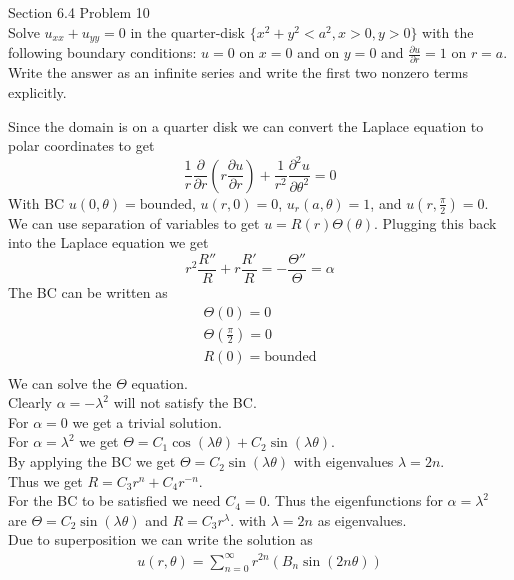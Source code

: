 \documentclass[answers,12pt,addpoints]{exam}
\begin{document}
\begin{questions}
    \question Section 6.4 Problem 10\\
    Solve \( u_{xx} + u_{yy} = 0 \) in the quarter-disk \( \{ x^2 + y^2 < a^2, x > 0, y > 0 \} \) with the following boundary conditions: \( u = 0 \) on \( x = 0 \) and on \( y = 0 \) and \( \frac{\partial u}{\partial r} = 1 \) on \( r = a \). Write the answer as an infinite series and write the first two nonzero terms explicitly.
    \begin{solution}
        Since the domain is on a quarter disk we can convert the Laplace equation to polar coordinates to get
        $$\frac{1}{r} \frac{\partial}{\partial r} \left( r \frac{\partial u}{\partial r} \right) + \frac{1}{r^2} \frac{\partial^2 u}{\partial \theta^2} = 0$$
        With BC $u(0, \theta) = \text{bounded}$, $u(r, 0) = 0$, $u_r(a, \theta) = 1$, and $u(r, \frac{\pi}{2}) = 0$.\\
        We can use separation of variables to get $u = R(r) \Theta(\theta)$. Plugging this back into the Laplace equation we get
        $$ r^2 \frac{R''}{R} + r \frac{R'}{R} = -\frac{\Theta''}{\Theta} = \alpha$$
        The BC can be written as
        \begin{align*}
            \Theta(0) = 0\\
            \Theta(\frac{\pi}{2}) = 0\\
            R(0) = \text{bounded}\\
        \end{align*}
        We can solve the $\Theta$ equation. \\
        Clearly $\alpha = - \lambda^2$ will not satisfy the BC. \\
        For $\alpha = 0$ we get a trivial solution. \\
        For $\alpha = \lambda^2$ we get $\Theta = C_1 \cos(\lambda \theta) + C_2 \sin(\lambda \theta)$. \\
        By applying the BC we get $\Theta = C_2 \sin(\lambda \theta)$ with eigenvalues $\lambda = 2n$. \\
        Thus we get $R = C_3 r^n + C_4 r^{-n}$. \\
        For the BC to be satisfied we need $C_4 = 0$. Thus the eigenfunctions for $\alpha = \lambda^2$ are $\Theta = C_2 \sin(\lambda \theta) $ and $R = C_3 r^{\lambda}$. with $\lambda = 2n$ as eigenvalues.\\
        Due to superposition we can write the solution as
        \begin{align*}
            u(r, \theta) = \sum_{n=0}^\infty r^{2n} (B_n \sin(2n\theta))

\end{align*}
\end{solution}
\end{questions}
\end{document}
